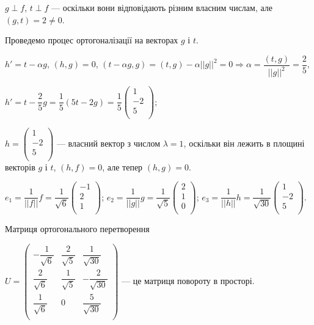 $g \perp f$, $t \perp f$ --- оскільки вони відповідають різним власним числам, але
$(g,t) = 2 \neq 0$.

Проведемо процес ортогоналізації на векторах $g$ і $t$.

$h' = t -\alpha g$, $(h,g) = 0$,
$(t - \alpha g ,g) = (t,g) - \alpha ||g||^2 = 0 \Rightarrow \alpha = \dfrac{(t,g)}{||g||^2} = \dfrac{2}{5},$

$h' = t - \dfrac{2}{5}g = \dfrac{1}{5}(5t - 2g) = \dfrac{1}{5}\begin{pmatrix}
	1 \\
	-2 \\
	5 \\
\end{pmatrix};$

$h = \begin{pmatrix}
	1 \\
	-2 \\
	5 \\
\end{pmatrix}$ --- власний вектор з числом $\lambda = 1$, оскільки він лежить в площині
векторів $g$ і $t$, $(h,f) = 0$, але тепер $(h, g) = 0$.

$e_1 = \dfrac{1}{||f||}f = \dfrac{1}{\sqrt{6}}\begin{pmatrix}
	-1 \\
	2 \\
	1 \\
\end{pmatrix}$; $e_2 = \dfrac{1}{||g||}g = \dfrac{1}{\sqrt{5}}\begin{pmatrix}
	2 \\
	1 \\
	0 \\
\end{pmatrix}$; $e_3 = \dfrac{1}{||h||}h = \dfrac{1}{\sqrt{30}} \begin{pmatrix}
	1 \\
	-2 \\
	5 \\
\end{pmatrix}$.

Матриця ортогонального перетворення

$U = \begin{pmatrix}
	-\dfrac{1}{\sqrt{6}} & \dfrac{2}{\sqrt{5}} & \dfrac{1}{\sqrt{30}} \\
	\dfrac{2}{\sqrt{6}}  & \dfrac{1}{\sqrt{5}} & -\dfrac{2}{\sqrt{30}} \\
	\dfrac{1}{\sqrt{6}}  & 0                   & \dfrac{5}{\sqrt{30}} \\
\end{pmatrix}$ --- це матриця повороту в просторі.

